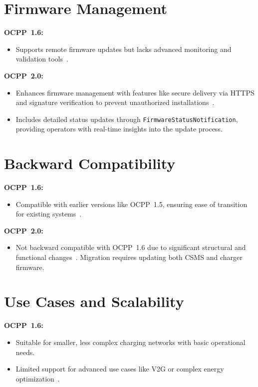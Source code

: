 \documentclass[12pt,a4paper]{report}
\begin{document}
\section{Firmware Management}

\textbf{OCPP~1.6:}
\begin{itemize}
  \item Supports remote firmware updates but lacks advanced monitoring and validation
        tools~\autocite{ocpp16_ed2}.
\end{itemize}

\textbf{OCPP~2.0:}
\begin{itemize}
  \item Enhances firmware management with features like secure delivery via HTTPS and signature
        verification to prevent unauthorized installations~\autocite{ocpp201}.
  \item Includes detailed status updates through \texttt{FirmwareStatusNotification}, providing
        operators with real-time insights into the update process.
\end{itemize}

\section{Backward Compatibility}

\textbf{OCPP~1.6:}
\begin{itemize}
  \item Compatible with earlier versions like OCPP~1.5, ensuring ease of transition for
        existing systems~\autocite{ocpp16_ed2}.
\end{itemize}

\textbf{OCPP~2.0:}
\begin{itemize}
  \item Not backward compatible with OCPP~1.6 due to significant structural and functional
        changes~\autocite{ocpp201}. Migration requires updating both CSMS and charger firmware.
\end{itemize}

\section{Use Cases and Scalability}

\textbf{OCPP~1.6:}
\begin{itemize}
  \item Suitable for smaller, less complex charging networks with basic operational needs.
  \item Limited support for advanced use cases like V2G or complex energy
        optimization~\autocite{luxman2024}.
\end{itemize}
\end{document}
